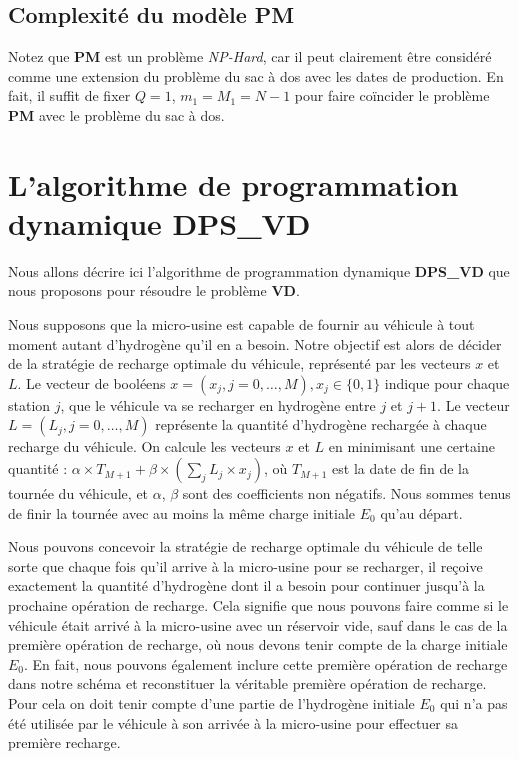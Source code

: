 \subsection{Complexité du modèle PM}
Notez que \textbf{PM} est un problème \textit{NP-Hard}, car il peut clairement être considéré comme une extension du problème du sac à dos avec les dates de production. En fait, il suffit de fixer $Q = 1$, $m_1 = M_1 = N-1$ pour faire coïncider le problème \textbf{PM} avec le problème du sac à dos.

\section{L'algorithme de programmation dynamique DPS\_VD}
\label{algo_VD}
Nous allons décrire ici l'algorithme de programmation dynamique \textbf{DPS\_VD} que nous proposons pour résoudre le problème \textbf{VD}.

Nous supposons que la micro-usine est capable de fournir au véhicule à tout moment autant d'hydrogène qu'il en a besoin. Notre objectif est alors de décider de la stratégie de recharge optimale du véhicule, représenté par les vecteurs $x$ et $L$. Le vecteur de booléens $x = (x_j, j = 0, \dots, M), x_j \in \{0, 1\}$ indique pour chaque station $j$, que le véhicule va se recharger en hydrogène entre $j$ et $j +1$.
Le vecteur $L = (L_j, j = 0, \dots,M)$ représente la quantité d'hydrogène rechargée à chaque recharge du véhicule. On calcule les vecteurs $x$ et $L$ en minimisant une certaine quantité : $\alpha \times T_{M+1} + \beta\times (\sum_j L_j\times x_j)$, où $T_{M+1}$ est la date de fin de la tournée du véhicule, et $\alpha$, $\beta$ sont des coefficients non négatifs. Nous sommes tenus de finir la tournée avec au moins la même charge initiale $E_0$ qu'au départ.	

Nous pouvons concevoir la stratégie de recharge optimale du véhicule de telle sorte que chaque fois qu'il arrive à la micro-usine pour se recharger, il reçoive exactement la quantité d'hydrogène dont il a besoin pour continuer jusqu'à la prochaine opération de recharge. Cela signifie que nous pouvons faire comme si le véhicule était arrivé à la micro-usine avec un réservoir vide, sauf dans le cas de la première opération de recharge, où nous devons tenir compte de la charge initiale $E_0$. En fait, nous pouvons également inclure cette première opération de recharge dans notre schéma et reconstituer la véritable première opération de recharge. Pour cela on doit tenir compte d'une partie de l'hydrogène initiale $E_0$ qui n'a pas été utilisée par le véhicule à son arrivée à la micro-usine pour effectuer sa première recharge.

